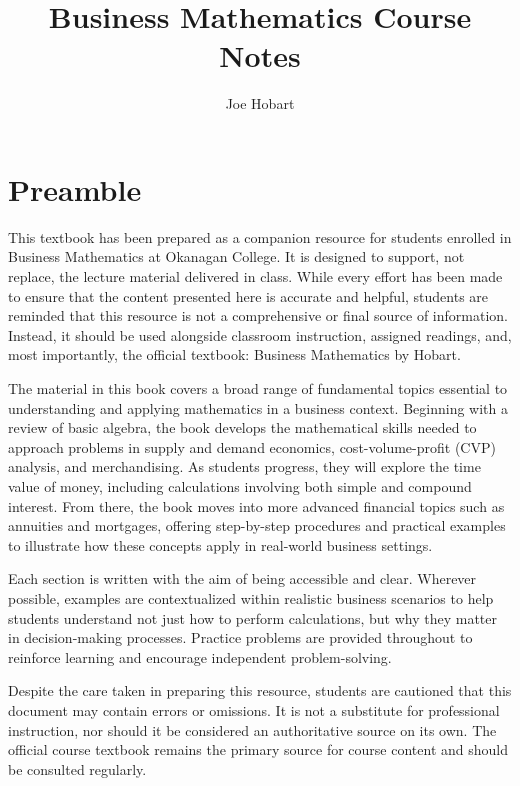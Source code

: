 \documentclass[
]{book}
\title{Business Mathematics Course Notes}
\author{Joe Hobart}
\date{}
\begin{document}
\maketitle

{
\setcounter{tocdepth}{1}
\tableofcontents
}
\chapter*{Preamble}\label{preamble}

This textbook has been prepared as a companion resource for students enrolled in Business Mathematics at Okanagan College. It is designed to support, not replace, the lecture material delivered in class. While every effort has been made to ensure that the content presented here is accurate and helpful, students are reminded that this resource is not a comprehensive or final source of information. Instead, it should be used alongside classroom instruction, assigned readings, and, most importantly, the official textbook: Business Mathematics by Hobart.

The material in this book covers a broad range of fundamental topics essential to understanding and applying mathematics in a business context. Beginning with a review of basic algebra, the book develops the mathematical skills needed to approach problems in supply and demand economics, cost-volume-profit (CVP) analysis, and merchandising. As students progress, they will explore the time value of money, including calculations involving both simple and compound interest. From there, the book moves into more advanced financial topics such as annuities and mortgages, offering step-by-step procedures and practical examples to illustrate how these concepts apply in real-world business settings.

Each section is written with the aim of being accessible and clear. Wherever possible, examples are contextualized within realistic business scenarios to help students understand not just how to perform calculations, but why they matter in decision-making processes. Practice problems are provided throughout to reinforce learning and encourage independent problem-solving.

Despite the care taken in preparing this resource, students are cautioned that this document may contain errors or omissions. It is not a substitute for professional instruction, nor should it be considered an authoritative source on its own. The official course textbook remains the primary source for course content and should be consulted regularly.
\end{document}

